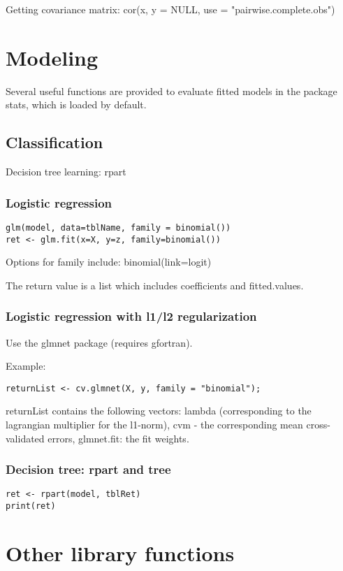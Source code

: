 \documentclass[oneside, article]{memoir}
\begin{document}
Getting covariance matrix: cor(x, y = NULL, use = "pairwise.complete.obs")

\section{Modeling}
Several useful functions are provided to evaluate fitted models in the package stats, which is loaded by default.



\subsection{Classification}
Decision tree learning: rpart

\subsubsection{Logistic regression}
\begin{verbatim}
glm(model, data=tblName, family = binomial())
ret <- glm.fit(x=X, y=z, family=binomial()) 

\end{verbatim}
Options for family include: binomial(link=logit)

The return value is a list which includes coefficients and fitted.values.


\subsubsection{Logistic regression with l1/l2 regularization}
Use the glmnet package (requires gfortran).

Example:
\begin{verbatim}
returnList <- cv.glmnet(X, y, family = "binomial");
\end{verbatim}

returnList contains the following vectors: lambda (corresponding to the lagrangian multiplier for the l1-norm), cvm - the corresponding mean cross-validated errors, glmnet.fit: the fit weights.

\subsubsection{Decision tree: rpart and tree}
\begin{verbatim}
ret <- rpart(model, tblRet)
print(ret)
\end{verbatim}


\section{Other library functions}
\end{document}
